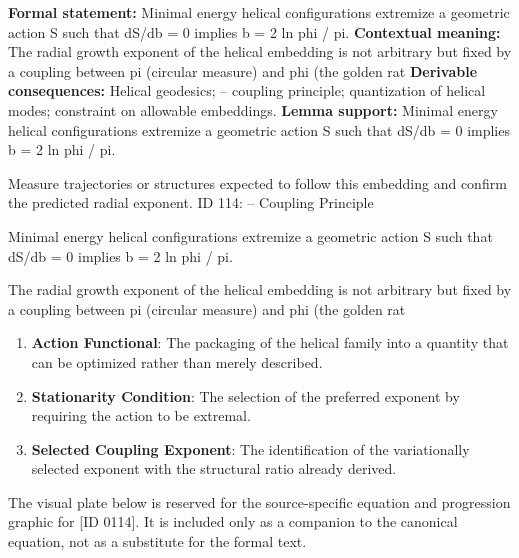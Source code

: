 \begingroup\footnotesize\setlength{\emergencystretch}{3em}\sloppy
\textbf{Formal statement:} Minimal energy helical configurations extremize a geometric action S such that dS/db = 0 implies b = 2 ln phi / pi.  
\textbf{Contextual meaning:} The radial growth exponent of the helical embedding is not arbitrary but fixed by a coupling between pi (circular measure) and phi (the golden rat
\textbf{Derivable consequences:} Helical geodesics;  --  coupling principle; quantization of helical modes; constraint on allowable embeddings.
\textbf{Lemma support:} Minimal energy helical configurations extremize a geometric action S such that dS/db = 0 implies b = 2 ln phi / pi.  \par
\endgroup

Measure trajectories or structures expected to follow this embedding and confirm the predicted radial exponent. ID 114:  --  Coupling Principle

Minimal energy helical configurations extremize a geometric action S such that dS/db = 0 implies b = 2 ln phi / pi.  

The radial growth exponent of the helical embedding is not arbitrary but fixed by a coupling between pi (circular measure) and phi (the golden rat
\endgroup

\begin{enumerate}[leftmargin=1.6em,itemsep=6pt,topsep=4pt]
\item \textbf{Action Functional}: The packaging of the helical family into a quantity that can be optimized rather than merely described.
\item \textbf{Stationarity Condition}: The selection of the preferred exponent by requiring the action to be extremal.
\item \textbf{Selected Coupling Exponent}: The identification of the variationally selected exponent with the structural ratio already derived.
\end{enumerate}

\begingroup\footnotesize\sloppy
The visual plate below is reserved for the source-specific equation and progression graphic for [ID 0114]. It is included only as a companion to the canonical equation, not as a substitute for the formal text.
\par\endgroup
\ifTZPDarkEdition
{}
\fi

